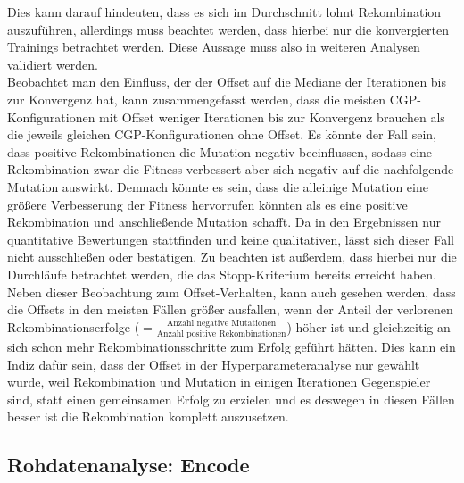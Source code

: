 Dies kann darauf hindeuten, dass es sich im Durchschnitt lohnt Rekombination auszuführen, allerdings muss beachtet werden, dass hierbei nur die konvergierten Trainings betrachtet werden.
Diese Aussage muss also in weiteren Analysen validiert werden.\\
Beobachtet man den Einfluss, der der Offset auf die Mediane der Iterationen bis zur Konvergenz hat, kann zusammengefasst werden, dass die meisten CGP-Konfigurationen mit Offset weniger Iterationen bis zur Konvergenz brauchen als die jeweils gleichen CGP-Konfigurationen ohne Offset.
Es könnte der Fall sein, dass positive Rekombinationen die Mutation negativ beeinflussen, sodass eine Rekombination zwar die Fitness verbessert aber sich negativ auf die nachfolgende Mutation auswirkt.
Demnach könnte es sein, dass die alleinige Mutation eine größere Verbesserung der Fitness hervorrufen könnten als es eine positive Rekombination und anschließende Mutation schafft.
Da in den Ergebnissen nur quantitative Bewertungen stattfinden und keine qualitativen, lässt sich dieser Fall nicht ausschließen oder bestätigen.
Zu beachten ist außerdem, dass hierbei nur die Durchläufe betrachtet werden, die das Stopp-Kriterium bereits erreicht haben.\\
Neben dieser Beobachtung zum Offset-Verhalten, kann auch gesehen werden, dass die Offsets in den meisten Fällen größer ausfallen, wenn der Anteil der verlorenen Rekombinationserfolge ($= \frac{\text{Anzahl negative Mutationen}}{\text{Anzahl positive Rekombinationen}}$) höher ist und gleichzeitig an sich schon mehr Rekombinationsschritte zum Erfolg geführt hätten.
Dies kann ein Indiz dafür sein, dass der Offset in der Hyperparameteranalyse nur gewählt wurde, weil Rekombination und Mutation in einigen Iterationen Gegenspieler sind, statt einen gemeinsamen Erfolg zu erzielen und es deswegen in diesen Fällen besser ist die Rekombination komplett auszusetzen.


\subsection{Rohdatenanalyse: Encode}
\label{subsec:rohdatenEncode}

